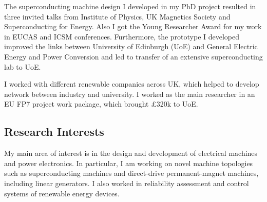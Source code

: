 \documentclass[a4paper,12pt]{article}
\begin{document}
The superconducting machine design I developed in my PhD project resulted in three invited talks from Institute of Physics, UK Magnetics Society and Superconducting for Energy. Also I got the Young Researcher Award for my work in EUCAS and ICSM conferences. Furthermore, the prototype I developed improved the links between University of Edinburgh (UoE) and General Electric Energy and Power Conversion and led to transfer of an extensive superconducting lab to UoE. 

I worked with different renewable companies across UK, which helped to develop network between industry and university. I worked as the main researcher in an EU FP7 project work package, which brought £320k to UoE. 


\clearpage
\subsection{Research Interests}

My main area of interest is in the design and development of electrical machines and power electronics. In particular, I am working on novel machine topologies such as superconducting machines and direct-drive permanent-magnet machines, including linear generators. I also worked in reliability assessment and control systems of renewable energy devices.
\end{document}
